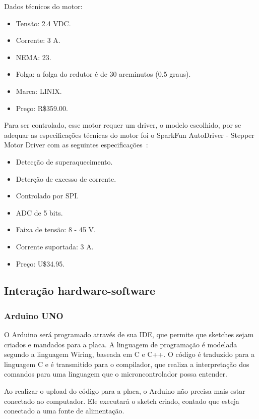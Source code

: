 Dados técnicos do motor:

\begin{itemize}
	\item Tensão: 2.4 VDC.
	\item Corrente: 3 A.
	\item NEMA: 23.
	\item Folga: a folga do redutor é de 30 arcminutos (0.5 graus).
	\item Marca: LINIX.
	\item Preço: R\$359.00.
\end{itemize}

Para ser controlado, esse motor requer um driver, o modelo escolhido, por se adequar as especificações técnicas do motor foi o SparkFun AutoDriver - Stepper Motor Driver com as seguintes especificações~\cite{pololu}:

\begin{itemize}
	\item Detecção de superaquecimento.
	\item Deterção de excesso de corrente.
	\item Controlado por SPI.
	\item ADC de 5 bits.
	\item Faixa de tensão: 8 - 45 V.
	\item Corrente suportada: 3 A.
	\item Preço: U\$34.95.
\end{itemize}

\subsection{Interação hardware-software}

	\subsubsection{Arduino UNO}

		O Arduino será programado através de sua IDE, que permite que sketches sejam criados e mandados para a placa. A linguagem de programação é modelada segundo a linguagem Wiring, baseada em C e C++. O código é traduzido para a linguagem C e é transmitido para o compilador, que realiza a interpretação dos comandos para uma linguagem que o microncontrolador possa entender.

		Ao realizar o upload do código para a placa, o Arduino não precisa mais estar conectado ao computador. Ele executará o sketch criado, contado que esteja conectado a uma fonte de alimentação.~\cite{embarcados1}

